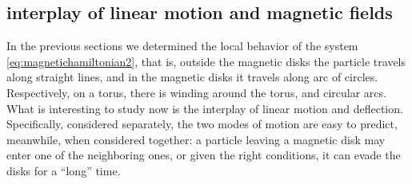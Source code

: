 \subsection{interplay of linear motion and magnetic fields}

In the previous sections we determined the local behavior of the system \eqref{eq:magnetichamiltonian2}, that is, outside the magnetic disks the particle travels along straight lines, and in the magnetic disks it travels along arc of circles. Respectively, on a torus, there is winding around the torus, and circular arcs. What is interesting to study now is the interplay of linear motion and deflection. Specifically, considered separately, the two modes of motion are easy to predict, meanwhile, when considered together: a particle leaving a magnetic disk may enter one of the neighboring ones, or given the right conditions, it can evade the disks for a ``long'' time. 